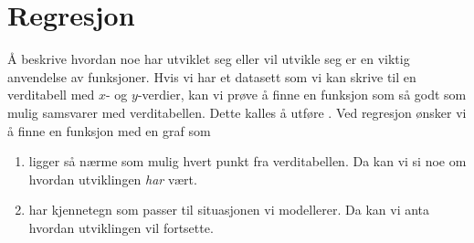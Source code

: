 \section{Regresjon \label{Regresjon}}
Å beskrive hvordan noe har utviklet seg eller vil utvikle seg er en viktig anvendelse av funksjoner. Hvis vi har et datasett som vi kan skrive til en verditabell med $x$- og $y$-verdier, kan vi prøve å finne en funksjon som så godt som mulig samsvarer med verditabellen. Dette kalles å utføre . Ved regresjon ønsker vi å finne en funksjon med en graf som
\begin{enumerate}[label=(\roman*)]
	\item ligger så nærme som mulig hvert punkt fra verditabellen. Da kan vi si noe om hvordan utviklingen \textsl{har} vært.
	\item har kjennetegn som passer til situasjonen vi modellerer. Da kan vi anta hvordan utviklingen vil fortsette.
\end{enumerate}

